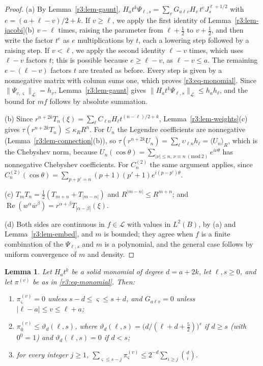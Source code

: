 \documentclass[11pt]{amsart}
\newtheorem{lemma}[theorem]{Lemma}
\theoremstyle{definition}
\theoremstyle{remark}
\numberwithin{equation}{section}
\newcommand{\bw}{\overline{w}}
\DeclareMathOperator{\re}{Re}
\newcommand{\nrm}[1]{\lVert #1\rVert}
\begin{document}
\begin{proof}
(a) By Lemma~\ref{r3:lem-gaunt}, $H_at^k\Psi_{\ell,s}=\sum_vG_{a\ell v}H_v\,t^eJ^{\ell+1/2}_s$ with $e=(a+\ell-v)/2+k$. If $v\geq\ell$, we apply the first identity of Lemma~\ref{r3:lem-jacobi}(b) $v-\ell$ times, raising the parameter from $\ell+\frac12$ to $v+\frac12$, and then write the factor $t^e$ as $e$ multiplications by $t$, each a lowering step followed by a raising step. If $v<\ell$, we apply the second identity $\ell-v$ times, which uses $\ell-v$ factors $t$; this is possible because $e\geq\ell-v$, as $\ell-v\leq a$. The remaining $e-(\ell-v)$ factors $t$ are treated as before. Every step is given by a nonnegative matrix with column sums one, which proves \eqref{r3:eq-monomial}. Since $\nrm{\Psi_{v,\varsigma}}_{\mathcal L}=h_v$, Lemma~\ref{r3:lem-gaunt} gives $\nrm{H_at^k\Psi_{\ell,s}}_{\mathcal L}\leq h_ah_\ell$, and the bound for $mf$ follows by absolute summation.

(b) Since $r^{n+2k}T_n(\xi)=\sum_\ell C_{\ell n}H_\ell t^{(n-\ell)/2+k}$, Lemma~\ref{r3:lem-weights}(c) gives $\tau(r^{n+2k}T_n)\leq\kappa_RR^n$. For $U_n$ the Legendre coefficients are nonnegative (Lemma~\ref{r3:lem-connection}(b)), so $\tau(r^{n+2k}U_n)=\sum_\ell\upsilon_{\ell n}h_\ell=\langle U_n\rangle_R$, which is the Chebyshev norm, because $U_n(\cos\theta)=\sum_{|\nu|\leq n,\,\nu\equiv n\ (\mathrm{mod}\ 2)}e^{i\nu\theta}$ has nonnegative Chebyshev coefficients. For $C^{(2)}_n$ the same argument applies, since $C^{(2)}_n(\cos\theta)=\sum_{p+p'=n}(p+1)(p'+1)e^{i(p-p')\theta}$.

(c) $T_mT_n=\frac12(T_{m+n}+T_{|m-n|})$ and $R^{|m-n|}\leq R^{m+n}$; and $\re(w^\alpha\bw^\beta)=r^{\alpha+\beta}T_{|\alpha-\beta|}(\xi)$.

(d) Both sides are continuous in $f\in\mathcal L$ with values in $L^2(B)$, by (a) and Lemma~\ref{r3:lem-embed}, and $m$ is bounded; they agree when $f$ is a finite combination of the $\Psi_{\ell,s}$ and $m$ is a polynomial, and the general case follows by uniform convergence of $m$ and density.
\end{proof}

\begin{lemma}\label{r3:lem-radial}
Let $H_at^k$ be a solid monomial of degree $d=a+2k$, let $\ell,s\geq0$, and let $\pi^{(v)}$ be as in \eqref{r3:eq-monomial}. Then:
\begin{enumerate}[label=\textup{(\alph*)}]
\item $\pi^{(v)}_\varsigma=0$ unless $s-d\leq\varsigma\leq s+d$, and $G_{a\ell v}=0$ unless $|\ell-a|\leq v\leq\ell+a$;
\item $\pi^{(v)}_0\leq\vartheta_d(\ell,s)$, where $\vartheta_d(\ell,s)=\big(d/(\ell+d+\frac52)\big)^s$ if $d\geq s$ (with $0^0=1$) and $\vartheta_d(\ell,s)=0$ if $d<s$;
\item for every integer $j\geq1$, $\sum_{\varsigma\leq s-j}\pi^{(v)}_\varsigma\leq2^{-d}\sum_{i\geq j}\binom di$.
\end{enumerate}
\end{lemma}
\end{document}

